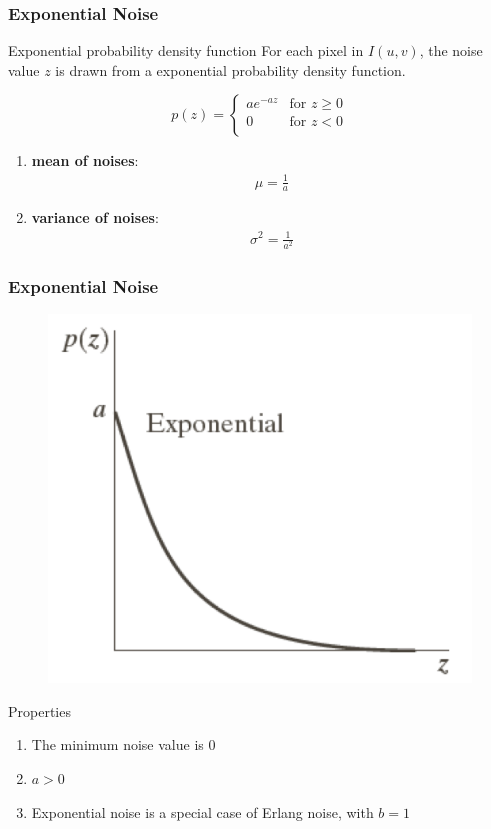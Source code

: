 \documentclass[english,11pt,table,handout]{beamer}
\begin{document}
\frame
{
	\frametitle{Exponential Noise}
	\begin{block}{Exponential probability density function}
		For each pixel in $I(u,v)$, the noise value $z$ is drawn from a exponential probability density function.
		
		$$
		p(z) =
		\begin{cases}
		ae^{-az}& \text{for } z \ge 0\\
		0 & \text{for } z < 0\\
		\end{cases}
		$$
		
		\begin{enumerate}
			\item \alert{\textbf{mean of noises}}: 
			\begin{align}
			\nonumber
			\mu = \frac{1}{a}
			\end{align}
			\item \alert{\textbf{variance of noises}}:
			\begin{align}
			\nonumber
			\sigma^2 = \frac{1}{a^2}
			\end{align}
		\end{enumerate}
		
	\end{block}
	
}
\frame
{
	\frametitle{Exponential Noise}
	\begin{figure}[!h]
		\includegraphics[scale=0.6]{exponential.png}
	\end{figure}
	
	\begin{alertblock}{Properties}
		\begin{enumerate}
			\item The minimum noise value is $0$
			\item $a > 0$
			\item Exponential noise is a special case of Erlang noise, with $b=1$		\end{enumerate}
	\end{alertblock}
}
\end{document}
